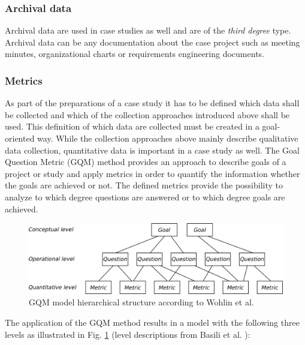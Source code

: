 \documentclass[runningheads]{llncs}
\begin{document}
\subsubsection{Archival data}
Archival data are used in case studies as well and are of the \textit{third degree} type. Archival data can be any documentation about the case project such as meeting minutes, organizational charts or requirements engineering documents.

\subsubsection{Metrics}
As part of the preparations of a case study it has to be defined which data shall be collected and which of the collection approaches introduced above shall be used. This definition of which data are collected must be created in a goal-oriented way. While the collection approaches above mainly describe qualitative data collection, quantitative data is important in a case study as well. The Goal Question Metric (GQM) method \cite{gqm} provides an approach to describe goals of a project or study and apply metrics in order to quantify the information whether the goals are achieved or not. The defined metrics provide the possibility to analyze to which degree questions are answered or to which degree goals are achieved.

\begin{figure}[H]
	\centering
	\includegraphics[width=1.0\textwidth]{gqm-structure}
	\caption{GQM model hierarchical structure according to Wohlin et al. \cite{Wohlin:2012:ESE:2349018}}
	\label{fig:gqm-model}
\end{figure} 

The application of the GQM method results in a model with the following three levels as illustrated in Fig. \ref{fig:gqm-model} (level descriptions from Basili et al. \cite{gqm}):
\end{document}
